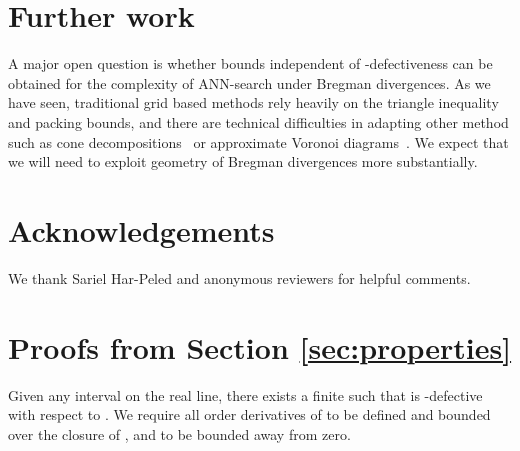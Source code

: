 \documentclass[11pt]{myclass}
\begin{document}
\section{Further work}
A major open question is whether bounds independent of -defectiveness can be obtained for the complexity of ANN-search under Bregman divergences. As we have seen, traditional grid based methods rely heavily on the triangle inequality and packing bounds, and there are technical difficulties in adapting other method such as cone decompositions~\cite{chanNN} or approximate Voronoi diagrams~\cite{plebs}. We expect that we will need to exploit geometry of Bregman divergences more substantially. 
\section{Acknowledgements}
We thank Sariel Har-Peled and anonymous reviewers for helpful comments.


\appendix
\section{Proofs from Section \ref{sec:properties}}
\label{sec:bounded}
\begin{lemma}\label{app:1}
Given any interval  on the real line, there exists a finite  such that   is -defective with respect to . We require all order derivatives of  to be defined and bounded over the closure of ,
and  to be bounded away from zero.
\end{lemma}
\end{document}
